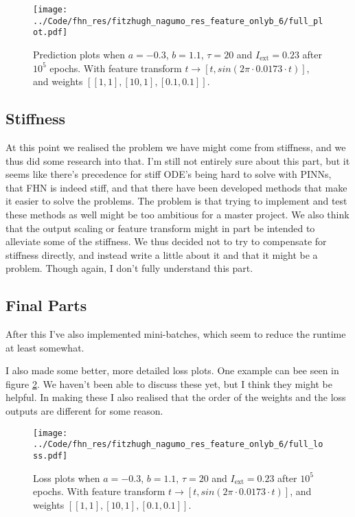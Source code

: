 \documentclass[a4paper]{article}
\begin{document}
\begin{figure}[H]
\centering 
\texttt{[image: ../Code/fhn\_res/fitzhugh\_nagumo\_res\_feature\_onlyb\_6/full\_plot.pdf]}
\caption{Prediction plots when $a=-0.3$, $b=1.1$, $\tau=20$ and $ I_{\text{ext}}=0.23$ after $10^5$  epochs. With feature transform $t \rightarrow \left[ t, sin(2 \pi \cdot 0.0173 \cdot t) \right] $, and weights $\left[ \left[ 1, 1\right], \left[ 10, 1\right], \left[ 0.1, 0.1\right]\right]$.}
\label{plot:oneplot_exe}
\end{figure}


\subsection{Stiffness}

At this point we realised the problem we have might come from stiffness, and we thus did some research into that. I'm still not entirely sure about this part, but it seems like there's precedence for stiff ODE's being hard to solve with PINNs, that FHN is indeed stiff, and that there have been developed methods that make it easier to solve the problems. The problem is that trying to implement and test these methods as well might be too ambitious for a master project. We also think that the output scaling or feature transform might in part be intended to alleviate some of the stiffness. We thus decided not to try to compensate for stiffness directly, and instead write a little about it and that it might be a problem. Though again, I don't fully understand this part.


\subsection{Final Parts}

After this I've also implemented mini-batches, which seem to reduce the runtime at least somewhat.

I also made some better, more detailed loss plots. One example can bee seen in figure \ref{plot:lossplot_exe}. We haven't been able to discuss these yet, but I think they might be helpful. In making these I also realised that the order of the weights and the loss outputs are different for some reason. 

\begin{figure}[H]
	\centering 
	\texttt{[image: ../Code/fhn\_res/fitzhugh\_nagumo\_res\_feature\_onlyb\_6/full\_loss.pdf]}
	\caption{Loss plots when $a=-0.3$, $b=1.1$, $\tau=20$ and $ I_{\text{ext}}=0.23$ after $10^5$  epochs. With feature transform $t \rightarrow \left[ t, sin(2 \pi \cdot 0.0173 \cdot t) \right] $, and weights $\left[ \left[ 1, 1\right], \left[ 10, 1\right], \left[ 0.1, 0.1\right]\right]$.}
	\label{plot:lossplot_exe}
\end{figure}
\end{document}
